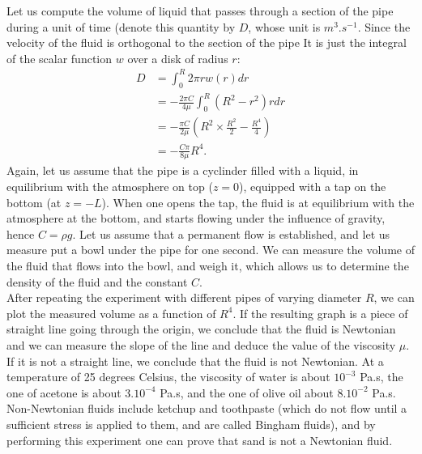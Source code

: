 \documentclass[DIV=12]{article}
\begin{document}
Let us compute the volume of liquid that passes through a
 section of the pipe during a unit of time (denote this quantity by $D$, whose unit is $m^3.s^{-1}$. Since the velocity 
 of the fluid is orthogonal to the section of the pipe It is just the integral of the scalar function $w$ over a disk of radius 
$r$:\\
\begin{equation}
  \begin{array}{ll} D&= \int_0^R 2\pi r w(r) dr\\
   & = -\frac{2\pi C}{4\mu} \int_0^R\left( R^2 - r^2\right) r dr\\
   & =- \frac{\pi C}{2\mu} \left( R^2 \times \frac{R^2}{2}- \frac{R^4}{4}\right)\\
   & = -\frac{C\pi}{8\mu} R^4.  
   \end{array}
\label{DCalc}
\end{equation}
Again, let us assume that the pipe is a cyclinder filled with a liquid, in equilibrium with the
atmosphere on top ($z=0$), equipped with a tap on the bottom (at $z=-L$). When one opens the tap, the fluid
 is at equilibrium with the atmosphere at the bottom, and starts flowing 
 under the influence of gravity, hence $C=\rho g$. Let us assume that a permanent flow is established,
 and let us measure put a bowl under the pipe for one second. We can measure the volume 
 of the fluid that flows into the bowl, and weigh it, which allows us 
 to determine the density of the fluid and the constant $C$.\\
 After repeating the experiment with different pipes of varying diameter $R$,
we can plot the measured volume as a function of $R^4$. If the resulting graph is 
 a piece of straight line going through the origin, we conclude that the fluid is Newtonian and
 we can measure the slope of the line 
 and deduce the value of the viscosity $\mu$.
 If it is not a straight line, we conclude that the fluid is not Newtonian. At a temperature of 25 degrees Celsius,
 the viscosity of water is about $10^{-3}$ Pa.s, the one of acetone is about $3.10^{-4}$ Pa.s, and the one of olive
 oil about $8.10^{-2}$ Pa.s. Non-Newtonian fluids include ketchup and toothpaste (which do not flow until 
 a sufficient stress is applied to them, and are called Bingham fluids), and by performing 
this experiment one can prove that  sand is not a Newtonian fluid. 
 
\end{document}
